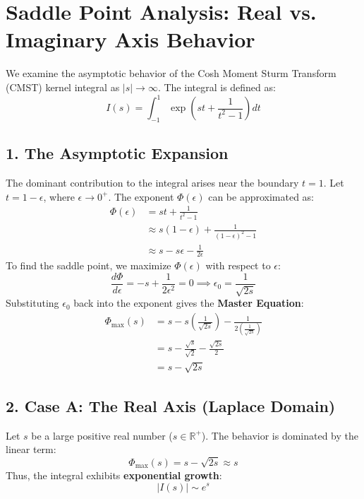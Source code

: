 \documentclass[11pt]{article}
\theoremstyle{breakdef}
\begin{document}
\section*{Saddle Point Analysis: Real vs. Imaginary Axis Behavior}

We examine the asymptotic behavior of the Cosh Moment Sturm Transform (CMST) kernel integral as $|s| \to \infty$. The integral is defined as:
\begin{equation}
    I(s) = \int_{-1}^{1} \exp\left( st + \frac{1}{t^2 - 1} \right) dt
\end{equation}

\subsection*{1. The Asymptotic Expansion}
The dominant contribution to the integral arises near the boundary $t = 1$. Let $t = 1 - \epsilon$, where $\epsilon \to 0^+$. The exponent $\Phi(\epsilon)$ can be approximated as:
\begin{align}
    \Phi(\epsilon) &= st + \frac{1}{t^2 - 1} \\
    &\approx s(1 - \epsilon) + \frac{1}{(1-\epsilon)^2 - 1} \\
    &\approx s - s\epsilon - \frac{1}{2\epsilon}
\end{align}
To find the saddle point, we maximize $\Phi(\epsilon)$ with respect to $\epsilon$:
\begin{equation}
    \frac{d\Phi}{d\epsilon} = -s + \frac{1}{2\epsilon^2} = 0 \implies \epsilon_0 = \frac{1}{\sqrt{2s}}
\end{equation}
Substituting $\epsilon_0$ back into the exponent gives the \textbf{Master Equation}:
\begin{align}
    \Phi_{\text{max}}(s) &= s - s\left(\frac{1}{\sqrt{2s}}\right) - \frac{1}{2\left(\frac{1}{\sqrt{2s}}\right)} \\
    &= s - \frac{\sqrt{s}}{\sqrt{2}} - \frac{\sqrt{2s}}{2} \\
    &= s - \sqrt{2s}
\end{align}

\subsection*{2. Case A: The Real Axis (Laplace Domain)}
Let $s$ be a large positive real number ($s \in \mathbb{R}^+$). The behavior is dominated by the linear term:
\begin{equation}
    \Phi_{\text{max}}(s) = s - \sqrt{2s} \approx s
\end{equation}
Thus, the integral exhibits \textbf{exponential growth}:
\begin{equation}
    |I(s)| \sim e^s
\end{equation}
\end{document}
